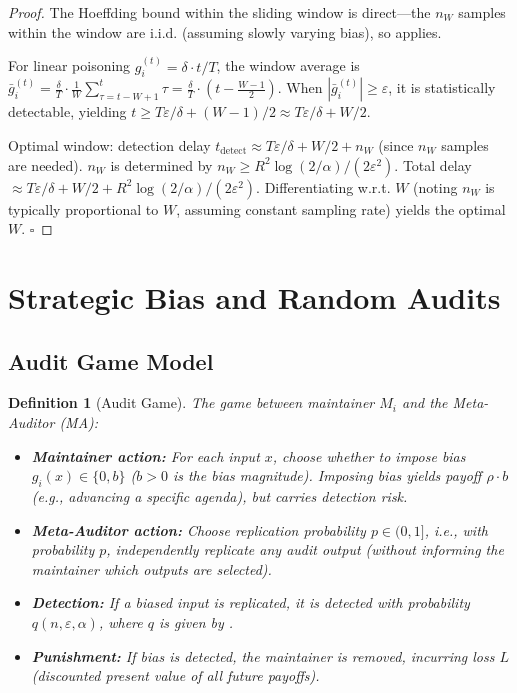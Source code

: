 \documentclass[11pt,a4paper]{article}
\newtheorem{definition}[theorem]{Definition}
\theoremstyle{definition}
\begin{document}
\begin{proof}
The Hoeffding bound within the sliding window is direct---the $n_W$ samples within the window are i.i.d. (assuming slowly varying bias), so  applies.

For linear poisoning $g_i^{(t)} = \delta \cdot t/T$, the window average is $\bar{g}_i^{(t)} = \frac{\delta}{T} \cdot \frac{1}{W} \sum_{\tau=t-W+1}^{t} \tau = \frac{\delta}{T} \cdot (t - \frac{W-1}{2})$. When $|\bar{g}_i^{(t)}| \geq \varepsilon$, it is statistically detectable, yielding $t \geq T\varepsilon/\delta + (W-1)/2 \approx T\varepsilon/\delta + W/2$.

Optimal window: detection delay $t_{\text{detect}} \approx T\varepsilon/\delta + W/2 + n_W$ (since $n_W$ samples are needed). $n_W$ is determined by $n_W \geq R^2\log(2/\alpha)/(2\varepsilon^2)$. Total delay $\approx T\varepsilon/\delta + W/2 + R^2\log(2/\alpha)/(2\varepsilon^2)$. Differentiating w.r.t. $W$ (noting $n_W$ is typically proportional to $W$, assuming constant sampling rate) yields the optimal $W$. \hfill$\square$
\end{proof}

\section{Strategic Bias and Random Audits}

\subsection{Audit Game Model}

\begin{definition}[Audit Game]
\label{def:audit_game}
The game between maintainer $M_i$ and the Meta-Auditor (MA):
\begin{itemize}
    \item \textbf{Maintainer action:} For each input $x$, choose whether to impose bias $g_i(x) \in \{0, b\}$ ($b > 0$ is the bias magnitude). Imposing bias yields payoff $\rho \cdot b$ (e.g., advancing a specific agenda), but carries detection risk.
    \item \textbf{Meta-Auditor action:} Choose replication probability $p \in (0, 1]$, i.e., with probability $p$, independently replicate any audit output (without informing the maintainer which outputs are selected).
    \item \textbf{Detection:} If a biased input is replicated, it is detected with probability $q(n, \varepsilon, \alpha)$, where $q$ is given by .
    \item \textbf{Punishment:} If bias is detected, the maintainer is removed, incurring loss $L$ (discounted present value of all future payoffs).
\end{itemize}
\end{definition}
\end{document}
